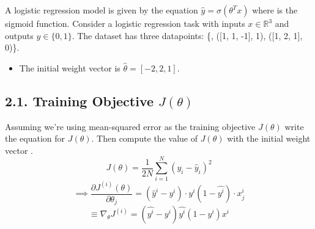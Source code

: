 \documentclass[11pt]{article}
\theoremstyle{plain}
\begin{document}
A logistic regression model is given by the equation $\hat{y}=\sigma(\theta^{T}x)$ where is the sigmoid function.  Consider a logistic regression task with inputs $x\in\mathbb{R}^{3}$ and outputs $y\in\{0,1\}$.  The dataset has three datapoints: \{, ([1, 1, -1], 1), ([1, 2, 1], 0)\}.
\begin{itemize}
	\item The initial weight vector is $\hat{\theta}=[-2,2,1]$.
\end{itemize}

\subsection*{2.1. Training Objective $J(\theta)$ }
Assuming we're using mean-squared error as the training objective $J(\theta)$ write the equation for $J(\theta)$.  Then compute the value of $J(\theta)$ with the initial weight vector .
\[
	J(\theta) = \frac{1}{2N}\sum_{i=1}^{N} (y_i - \hat{y}_i)^2
\]
\[
	\implies \frac{\partial J^{(i)}(\theta)}{\partial \theta_j} = (\hat{y}^i-y^i) \cdot y^i(1-\hat{y^i})\cdot x_j^i
\]
\[
	\equiv \nabla_{\theta}J^{(i)} = (\hat{y^i}-y^i)\hat{y^i}(1-y^i)x^i
\]
\end{document}
